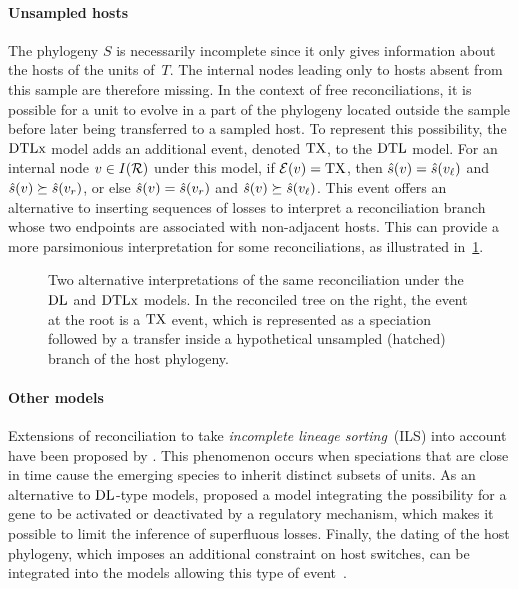 \paragraph{Unsampled hosts~\textup{\parencite{Szoelloesi2013LateralGeneTransfer,Weiner2021ImprovedDuplicationTransfer}}}
The phylogeny \(S\) is necessarily incomplete since it only gives information about the hosts of the units of~\(T\).
The internal nodes leading only to hosts absent from this sample are therefore missing.
In the context of free reconciliations, it is possible for a unit to evolve in a part of the phylogeny located outside the sample before later being transferred to a sampled host.
To represent this possibility, the \(\mathrm{D}\mathrm{T}\mathrm{L}\mathrm{x}\) model adds an additional event, denoted \(\mathrm{TX}\), to the \(\mathrm{D}\mathrm{T}\mathrm{L}\) model.
For an internal node \(v \in I(\mathcal{R})\) under this model, if \(\mathcal{E}(v) = \mathrm{TX}\), then \(\hat{s}(v) = \hat{s}(v_\mathit{\ell})\) and \(\hat{s}(v) \succeq \hat{s}(v_r)\), or else \(\hat{s}(v) = \hat{s}(v_r)\) and \(\hat{s}(v) \succeq \hat{s}(v_\mathit{\ell})\).
This event offers an alternative to inserting sequences of losses to interpret a reconciliation branch whose two endpoints are associated with non-adjacent hosts.
This can provide a more parsimonious interpretation for some reconciliations, as illustrated in~\cref{fig:reconciliation:rec-dtlx}.

\begin{figure}[htb]
    \capstart
    \centering
    
    \caption[Alternative interpretations of the same reconciliation under two models]{
        Two alternative interpretations of the same reconciliation under the \(\mathrm{D}\mathrm{L}\) and \(\mathrm{D}\mathrm{T}\mathrm{L}\mathrm{x}\) models.
        In the reconciled tree on the right, the event at the root is a \(\mathrm{TX}\) event, which is represented as a speciation followed by a transfer inside a hypothetical unsampled (hatched) branch of the host phylogeny.
    }
    \label{fig:reconciliation:rec-dtlx}
\end{figure}

\paragraph{Other models}
Extensions of reconciliation to take \emph{incomplete lineage sorting}~(ILS) into account have been proposed by \textcite{Rasmussen2012UnifiedModelingGene,Wu2013MostParsimoniousReconciliation,Chan2017InferringIncompleteLineage}.
This phenomenon occurs when speciations that are close in time cause the emerging species to inherit distinct subsets of units.
As an alternative to \(\mathrm{D}\mathrm{L}\)-type models, \textcite{Goodman1979FittingGeneLineage} proposed a model integrating the possibility for a gene to be activated or deactivated by a regulatory mechanism, which makes it possible to limit the inference of superfluous losses.
Finally, the dating of the host phylogeny, which imposes an additional constraint on host switches, can be integrated into the models allowing this type of event~\parencite{Tofigh2011SimultaneousIdentificationDuplications}.


